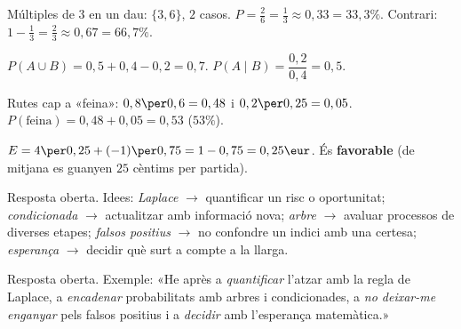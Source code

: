 \begin{solucions}
\begin{sollist}
  \item Múltiples de $3$ en un dau: $\{3,6\}$, $2$ casos.
        $P=\frac{2}{6}=\frac{1}{3}\approx 0,33=33,3\%$. Contrari:
        $1-\frac{1}{3}=\frac{2}{3}\approx 0,67=66,7\%$.
  \item $P(A\cup B)=0,5+0,4-0,2=0,7$. $P(A\mid B)=\dfrac{0,2}{0,4}=0,5$.
  \item Rutes cap a «feina»: $0,8\per 0,6=0,48$ i $0,2\per 0,25=0,05$.
        $P(\text{feina})=0,48+0,05=0,53$ ($53\%$).
  \item $E=4\per 0,25+(-1)\per 0,75=1-0,75=0,25\eur$. És \textbf{favorable} (de mitjana
        es guanyen $25$ cèntims per partida).
  \item Resposta oberta. Idees: \emph{Laplace} $\rightarrow$ quantificar un risc o
        oportunitat; \emph{condicionada} $\rightarrow$ actualitzar amb informació nova;
        \emph{arbre} $\rightarrow$ avaluar processos de diverses etapes; \emph{falsos
        positius} $\rightarrow$ no confondre un indici amb una certesa; \emph{esperança}
        $\rightarrow$ decidir què surt a compte a la llarga.
  \item Resposta oberta. Exemple: «He après a \emph{quantificar} l'atzar amb la regla de
        Laplace, a \emph{encadenar} probabilitats amb arbres i condicionades, a \emph{no
        deixar-me enganyar} pels falsos positius i a \emph{decidir} amb l'esperança
        matemàtica.»
\end{sollist}
\end{solucions}
